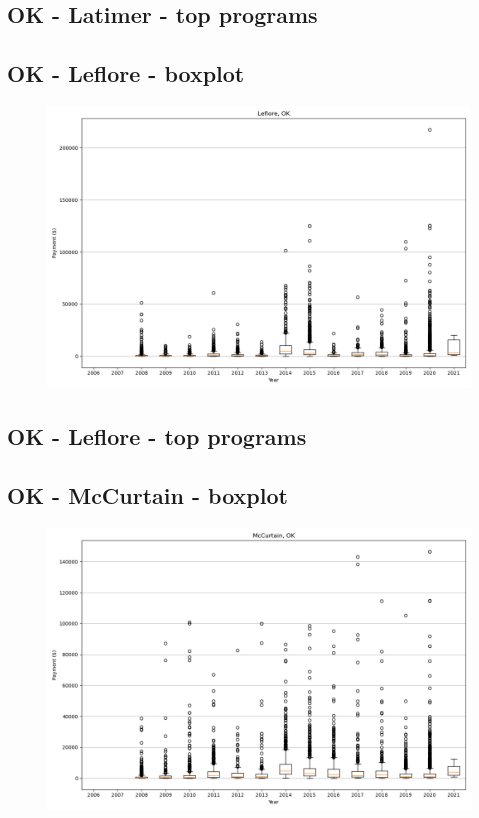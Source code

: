 \subsection*{OK - Latimer - top programs}

\newpage
\subsection*{OK - Leflore - boxplot}
\begin{figure}[h]
\centering
\includegraphics[width=7in]{../output/boxplots/counties/Leflore-OK_boxplot.png}
\end{figure}


\subsection*{OK - Leflore - top programs}

\newpage
\subsection*{OK - McCurtain - boxplot}
\begin{figure}[h]
\centering
\includegraphics[width=7in]{../output/boxplots/counties/McCurtain-OK_boxplot.png}
\end{figure}


